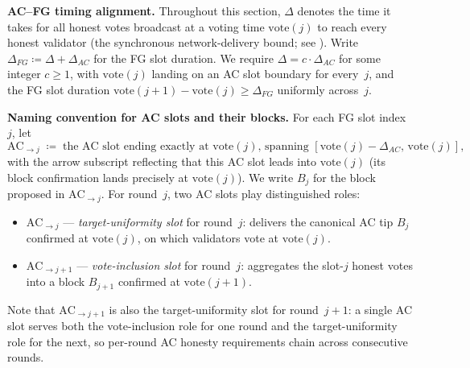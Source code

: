 \documentclass{article}
\newcommand{\vote}{\ensuremath{\mathrm{vote}}}
\renewcommand{\paragraph}[1]{\vspace{7pt}\noindent\textbf{#1}}
\theoremstyle{plain}
\theoremstyle{definition}
\theoremstyle{remark}
\begin{document}
\paragraph{AC--FG timing alignment.}
Throughout this section, $\Delta$ denotes the time it takes for all honest votes broadcast at a voting time $\vote(j)$ to reach every honest validator (the synchronous network-delivery bound; see ). Write $\Delta_{\mathit{FG}} \coloneqq \Delta + \Delta_{\mathit{AC}}$ for the FG slot duration. We require $\Delta = c \cdot \Delta_{\mathit{AC}}$ for some integer $c \geq 1$, with $\vote(j)$ landing on an AC slot boundary for every~$j$, and the FG slot duration $\vote(j+1) - \vote(j) \geq \Delta_{\mathit{FG}}$ uniformly across~$j$.

\paragraph{Naming convention for AC slots and their blocks.}
For each FG slot index~$j$, let
\[
  \mathrm{AC}_{\to j} \;\coloneqq\; \text{the AC slot ending exactly at $\vote(j)$, spanning $[\vote(j) - \Delta_{\mathit{AC}},\, \vote(j)]$,}
\]
with the arrow subscript reflecting that this AC slot leads into $\vote(j)$ (its block confirmation lands precisely at $\vote(j)$). We write $B_j$ for the block proposed in $\mathrm{AC}_{\to j}$. For round~$j$, two AC slots play distinguished roles:
\begin{itemize}
  \item $\mathrm{AC}_{\to j}$ --- \emph{target-uniformity slot} for round~$j$: delivers the canonical AC tip $B_j$ confirmed at $\vote(j)$, on which validators vote at $\vote(j)$.
  \item $\mathrm{AC}_{\to j+1}$ --- \emph{vote-inclusion slot} for round~$j$: aggregates the slot-$j$ honest votes into a block $B_{j+1}$ confirmed at $\vote(j+1)$.
\end{itemize}
Note that $\mathrm{AC}_{\to j+1}$ is also the target-uniformity slot for round~$j+1$: a single AC slot serves both the vote-inclusion role for one round and the target-uniformity role for the next, so per-round AC honesty requirements chain across consecutive rounds.
\end{document}
